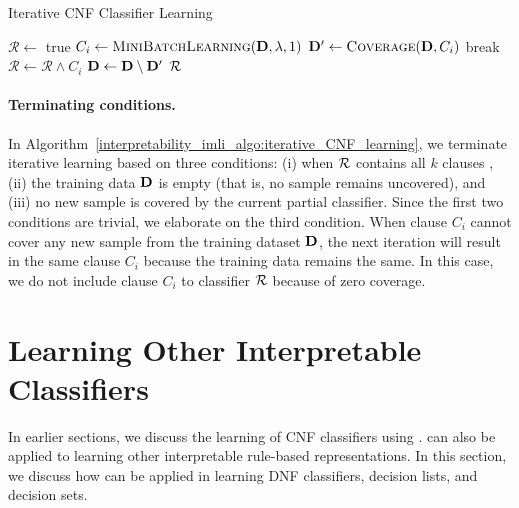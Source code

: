 \begin{algorithm}
	\caption{Iterative CNF Classifier Learning}
	\label{interpretability_imli_algo:iterative_CNF_learning}
	\begin{algorithmic}[1]
		\State $ \mathcal{R} \leftarrow $ true 
		\State $ C_i \leftarrow \textsc{MiniBatchLearning}( \mathbf{D},\lambda, 1) $ 
		\label{interpretability_imli_algo:iterative_CNF_learning_incremental_learning}
		\State $ \mathbf{D}' \leftarrow \textsc{Coverage}(\mathbf{D}, C_i) $
		\label{interpretability_imli_algo:iterative_CNF_learning_coverage}
		 
		\State break
		\EndIf
		\State $ \mathcal{R} \leftarrow \mathcal{R}  \wedge C_i $
		\State $ \mathbf{D}  \leftarrow \mathbf{D}  \setminus \mathbf{D}' $ 
		\EndFor
		\State \Return $ {\mathcal{R}} $
		\EndProcedure
	\end{algorithmic}
\end{algorithm}

\paragraph{Terminating conditions.} In Algorithm~\ref{interpretability_imli_algo:iterative_CNF_learning}, we terminate iterative learning based on three conditions: (i) when $ {\mathcal{R}} $ contains all $ k $ clauses , (ii) the training data $ \mathbf{D} $ is empty (that is, no sample remains uncovered), and (iii) no new sample is covered by the current partial classifier. Since the first two conditions are trivial, we elaborate on the third condition. When clause $ C_i $ cannot cover any new sample from the training dataset $ \mathbf{D} $, the next iteration will result in the same clause $ C_i $ because the training data remains the same. In this case, we do not include clause $ C_i $ to classifier $ {\mathcal{R}} $ because of zero coverage. 




\section{Learning Other Interpretable Classifiers}
\label{interpretability_imli_sec:application}
In earlier sections, we discuss the learning of CNF classifiers using  {\imli}. {\imli} can also be applied to learning other interpretable rule-based representations. In this section, we discuss how {\imli} can be applied in learning DNF classifiers, decision lists, and decision sets.

